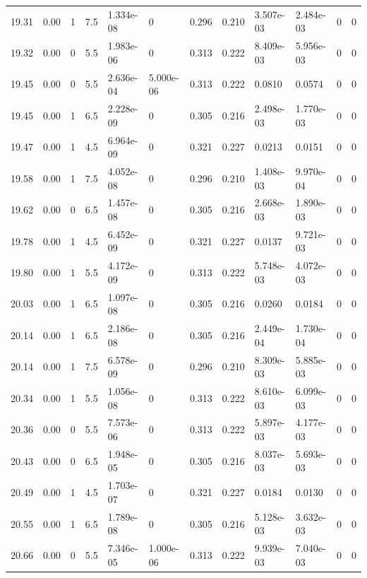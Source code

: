 \documentclass[preview]{standalone}
\begin{document}
{{{{{{\begin{tabular}{L{1.2cm}C{1.2cm} C{0.3cm}C{0.5cm} C{1.4cm}C{1.4cm} C{1.4cm}C{1.4cm} C{1.6cm}C{1.6cm} C{1.6cm}C{1.6cm}}
  19.31  &  0.00  & 1     & 7.5 &  1.334e-08  & 0  &  0.296&   0.210& 3.507e-03 & 2.484e-03   &  0 & 0  \\ 
  19.32  &  0.00  & 0     & 5.5 &  1.983e-06  & 0  &  0.313&   0.222& 8.409e-03 & 5.956e-03   &  0 & 0  \\ 
  19.45  &  0.00  & 0     & 5.5 &  2.636e-04  & 5.000e-06  &  0.313&   0.222& 0.0810 & 0.0574   &  0 & 0  \\ 
  19.45  &  0.00  & 1     & 6.5 &  2.228e-09  & 0  &  0.305&   0.216& 2.498e-03 & 1.770e-03   &  0 & 0  \\ 
  19.47  &  0.00  & 1     & 4.5 &  6.964e-09  & 0  &  0.321&   0.227& 0.0213 & 0.0151   &  0 & 0  \\ 
  19.58  &  0.00  & 1     & 7.5 &  4.052e-08  & 0  &  0.296&   0.210& 1.408e-03 & 9.970e-04   &  0 & 0  \\ 
  19.62  &  0.00  & 0     & 6.5 &  1.457e-08  & 0  &  0.305&   0.216& 2.668e-03 & 1.890e-03   &  0 & 0  \\ 
  19.78  &  0.00  & 1     & 4.5 &  6.452e-09  & 0  &  0.321&   0.227& 0.0137 & 9.721e-03   &  0 & 0  \\ 
  19.80  &  0.00  & 1     & 5.5 &  4.172e-09  & 0  &  0.313&   0.222& 5.748e-03 & 4.072e-03   &  0 & 0  \\ 
  20.03  &  0.00  & 1     & 6.5 &  1.097e-08  & 0  &  0.305&   0.216& 0.0260 & 0.0184   &  0 & 0  \\ 
  20.14  &  0.00  & 1     & 6.5 &  2.186e-08  & 0  &  0.305&   0.216& 2.449e-04 & 1.730e-04   &  0 & 0  \\ 
  20.14  &  0.00  & 1     & 7.5 &  6.578e-09  & 0  &  0.296&   0.210& 8.309e-03 & 5.885e-03   &  0 & 0  \\ 
  20.34  &  0.00  & 1     & 5.5 &  1.056e-08  & 0  &  0.313&   0.222& 8.610e-03 & 6.099e-03   &  0 & 0  \\ 
  20.36  &  0.00  & 0     & 5.5 &  7.573e-06  & 0  &  0.313&   0.222& 5.897e-03 & 4.177e-03   &  0 & 0  \\ 
  20.43  &  0.00  & 0     & 6.5 &  1.948e-05  & 0  &  0.305&   0.216& 8.037e-03 & 5.693e-03   &  0 & 0  \\ 
  20.49  &  0.00  & 1     & 4.5 &  1.703e-07  & 0  &  0.321&   0.227& 0.0184 & 0.0130   &  0 & 0  \\ 
  20.55  &  0.00  & 1     & 6.5 &  1.789e-08  & 0  &  0.305&   0.216& 5.128e-03 & 3.632e-03   &  0 & 0  \\ 
  20.66  &  0.00  & 0     & 5.5 &  7.346e-05  & 1.000e-06  &  0.313&   0.222& 9.939e-03 & 7.040e-03   &  0 & 0  \\ 

\end{tabular}}}}}}}
\end{document}
